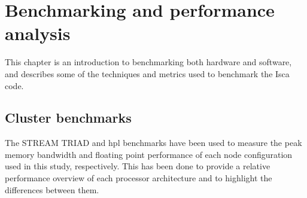 \documentclass[a4paper,11pt]{report}
\begin{document}
\chapter{Benchmarking and performance analysis}
This chapter is an introduction to benchmarking both hardware and software, and describes some of the techniques and metrics used to benchmark the Isca code. 
\section{Cluster benchmarks}
\label{sec:cluster-bench}
The STREAM TRIAD and \gls{hpl} benchmarks have been used to measure the peak memory bandwidth and floating point performance of each node configuration used in this study, respectively. This has been done to provide a relative performance overview of each processor architecture and to highlight the differences between them. 
\end{document}
